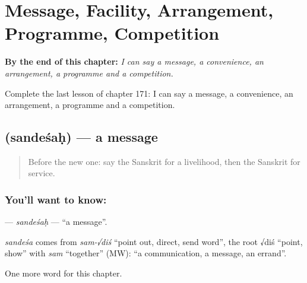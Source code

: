 
\chapter{Message, Facility, Arrangement, Programme, Competition}
\label{ch:sa-message-convenience-arrangement-programme-competition}

\begin{chapteropening}
\textbf{By the end of this chapter:} \emph{I can say a message, a convenience, an arrangement, a programme and a competition.}

Complete the last lesson of chapter 171: I can say a message, a convenience, an arrangement, a programme and a competition.
\end{chapteropening}

\section[\texorpdfstring{\sk{सन्देशः} (sandeśaḥ)}{सन्देशः (sandeśaḥ)}]{ (sandeśaḥ) — a message}

\label{lesson:SA-C171-sandesah}



\begin{quote}
Before the new one: say the Sanskrit for a livelihood, then the Sanskrit for service.
\end{quote}

\subsection*{You'll want to know: }
\textbf{} — \emph{sandeśaḥ} — \textquotedblleft{}a message\textquotedblright{}.

\begin{cousinweb}
\emph{sandeśa} comes from \emph{sam-√diś} \textquotedblleft{}point out, direct, send word\textquotedblright{}, the root √diś \textquotedblleft{}point, show\textquotedblright{} with \emph{sam} \textquotedblleft{}together\textquotedblright{} (MW): \textquotedblleft{}a communication, a message, an errand\textquotedblright{}.
\end{cousinweb}

\begin{grammarlens}[title={What you've built}]
One more word for this chapter.
\end{grammarlens}

